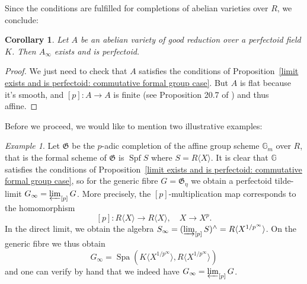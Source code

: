 \documentclass[11pt,oneside]{amsart}
\newtheorem{corollary}[theorem]{Corollary}
\theoremstyle{definition}
\theoremstyle{remark}
\newtheorem*{example}{Example}
\begin{document}
	Since the conditions are fulfilled for completions of abelian varieties over $R$, we conclude:
	\begin{corollary}\label{tilde limit exists in the good reduction case}
		Let $A$ be an abelian variety of good reduction over a perfectoid field $K$. Then $A_\infty$ exists and is perfectoid.
	\end{corollary}
	\begin{proof}
	We just need to check that $A$ satisfies the conditions of Proposition~\ref{limit exists and is perfectoid: commutative formal group case}. But $A$ is flat because it's smooth, and $[p]:A\rightarrow A$ is finite (see Proposition 20.7 of \cite{Milne AV in Cornell-Silverman}) and thus affine.
	\end{proof}
	Before we proceed, we would like to mention two illustrative examples:
	\begin{example}
		Let $\mathfrak G$ be the $p$-adic completion of the affine group scheme $\mathbb G_m$ over $R$, that is the formal scheme of $\mathfrak G$ is $\operatorname {Spf} S$ where $S=R\langle X \rangle$.  It is clear that $\mathbb G$ satisfies the conditions of Proposition~\ref{limit exists and is perfectoid: commutative formal group case}, so for the generic fibre $G=\mathfrak G_\eta$ we obtain a perfectoid tilde-limit $G_\infty = \varprojlim_{[p]} G$. More precisely, the $[p]$-multiplication map corresponds to the homomorphism
		\[[p]:R\langle X \rangle\rightarrow  R\langle X \rangle, \quad X\rightarrow X^{p}.\]
		In the direct limit, we obtain the algebra $S_\infty = (\varinjlim_{[p]} S)^{\wedge} = R\langle X^{1/p^\infty} \rangle$. On the generic fibre we thus obtain
		\[G_\infty = \operatorname{Spa}(K\langle X^{1/p^\infty} \rangle,R\langle X^{1/p^\infty} \rangle)\]
		and one can verify by hand that we indeed have $G_\infty = \varprojlim_{[p]} G$.
	\end{example}
\end{document}
